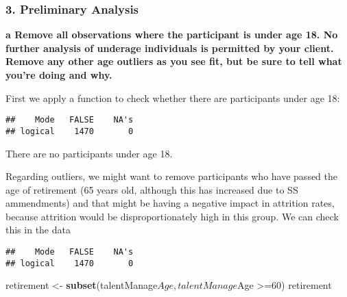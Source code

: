 \documentclass[]{article}
\newenvironment{Shaded}{\begin{snugshade}}{\end{snugshade}}
\newcommand{\KeywordTok}[1]{\textcolor[rgb]{0.13,0.29,0.53}{\textbf{{#1}}}}
\newcommand{\DecValTok}[1]{\textcolor[rgb]{0.00,0.00,0.81}{{#1}}}
\newcommand{\StringTok}[1]{\textcolor[rgb]{0.31,0.60,0.02}{{#1}}}
\newcommand{\CommentTok}[1]{\textcolor[rgb]{0.56,0.35,0.01}{\textit{{#1}}}}
\newcommand{\NormalTok}[1]{{#1}}
\begin{document}
\subsubsection{3. Preliminary Analysis}\label{preliminary-analysis}

\textbf{a Remove all observations where the participant is under age 18.
No further analysis of underage individuals is permitted by your client.
Remove any other age outliers as you see fit, but be sure to tell what
you're doing and why.}

First we apply a function to check whether there are participants under
age 18:

\begin{Shaded}
\end{Shaded}

\begin{verbatim}
##    Mode   FALSE    NA's 
## logical    1470       0
\end{verbatim}

There are no participants under age 18.

Regarding outliers, we might want to remove participants who have passed
the age of retirement (65 years old, although this has increased due to
SS ammendments) and that might be having a negative impact in attrition
rates, because attrition would be disproportionately high in this group.
We can check this in the data

\begin{Shaded}
\end{Shaded}

\begin{verbatim}
##    Mode   FALSE    NA's 
## logical    1470       0
\end{verbatim}

\begin{Shaded}
\begin{Highlighting}[]
\NormalTok{retirement <-}\StringTok{ }\KeywordTok{subset}\NormalTok{(talentManage$Age, talentManage$Age >=}\DecValTok{60}\NormalTok{)}
\NormalTok{retirement  }
\end{Highlighting}
\end{Shaded}
\end{document}
